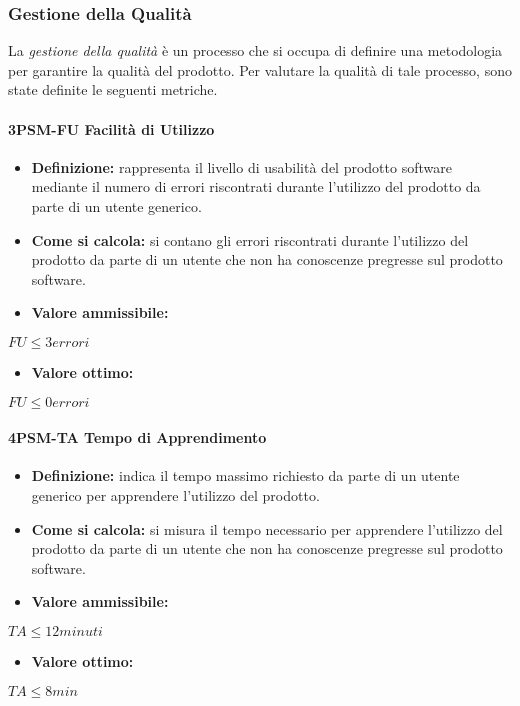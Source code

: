 \subsubsection{Gestione della Qualità}
La \emph{gestione della qualità} è un processo che si occupa di definire una metodologia per garantire la qualità del prodotto. Per valutare la qualità di tale processo, sono state definite le seguenti metriche.

\paragraph*{3PSM-FU Facilità di Utilizzo}
\begin{itemize}
    \item \textbf{Definizione:} rappresenta il livello di usabilità del prodotto software mediante il numero di errori riscontrati durante l’utilizzo del prodotto da parte di un utente generico.
    \item \textbf{Come si calcola:} si contano gli errori riscontrati durante l’utilizzo del prodotto da parte di un utente che non ha conoscenze pregresse sul prodotto software.
\end{itemize}
\begin{itemize}
    \item \textbf{Valore ammissibile:}
\end{itemize}
\begin{center}
    $FU \leq 3 errori$
\end{center}
\begin{itemize}
    \item \textbf{Valore ottimo:}
\end{itemize}
\begin{center}
    $FU \leq 0 errori$
\end{center}

\paragraph*{4PSM-TA Tempo di Apprendimento}
\begin{itemize}
    \item \textbf{Definizione:} indica il tempo massimo richiesto da parte di un utente generico per apprendere l’utilizzo del prodotto.
    \item \textbf{Come si calcola:} si misura il tempo necessario per apprendere l’utilizzo del prodotto da parte di un utente che non ha conoscenze pregresse sul prodotto software.
\end{itemize}
\begin{itemize}
    \item \textbf{Valore ammissibile:}
\end{itemize}
\begin{center}
    $TA \leq 12 minuti$
\end{center}
\begin{itemize}
    \item \textbf{Valore ottimo:}
\end{itemize}
\begin{center}
    $TA \leq 8 min$
\end{center}

